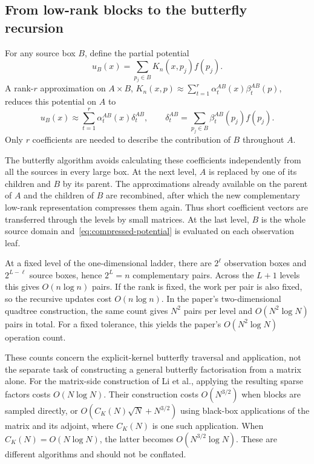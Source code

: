 \subsection{From low-rank blocks to the butterfly recursion}
\label{subsec:butterfly-recursion}

For any source box $B$, define the partial potential
\begin{equation}
    u_B(x)=\sum_{p_j\in B}K_n(x,p_j)f(p_j).
\end{equation}
A rank-$r$ approximation on $A\times B$,
$K_n(x,p)\approx\sum_{t=1}^{r}\alpha_t^{AB}(x)\beta_t^{AB}(p)$, reduces this potential on $A$ to
\begin{equation}
    u_B(x)\approx\sum_{t=1}^{r}\alpha_t^{AB}(x)\delta_t^{AB},
    \qquad
    \delta_t^{AB}=\sum_{p_j\in B}\beta_t^{AB}(p_j)f(p_j).
    \label{eq:compressed-potential}
\end{equation}
Only $r$ coefficients are needed to describe the contribution of $B$ throughout $A$.

The butterfly algorithm avoids calculating these coefficients independently from all the sources in every large box. At the next level, $A$ is replaced by one of its children and $B$ by its parent. The approximations already available on the parent of $A$ and the children of $B$ are recombined, after which the new complementary low-rank representation compresses them again. Thus short coefficient vectors are transferred through the levels by small matrices. At the last level, $B$ is the whole source domain and~\eqref{eq:compressed-potential} is evaluated on each observation leaf.

At a fixed level of the one-dimensional ladder, there are $2^\ell$ observation boxes and $2^{L-\ell}$ source boxes, hence $2^L=n$ complementary pairs. Across the $L+1$ levels this gives $O(n\log n)$ pairs. If the rank is fixed, the work per pair is also fixed, so the recursive updates cost $O(n\log n)$. In the paper's two-dimensional quadtree construction, the same count gives $N^2$ pairs per level and $O(N^2\log N)$ pairs in total. For a fixed tolerance, this yields the paper's $O(N^2\log N)$ operation count.

These counts concern the explicit-kernel butterfly traversal and application, not the separate task of constructing a general butterfly factorisation from a matrix alone. For the matrix-side construction of Li et al., applying the resulting sparse factors costs $O(N\log N)$. Their construction costs $O(N^{3/2})$ when blocks are sampled directly, or $O(C_K(N)\sqrt N+N^{3/2})$ using black-box applications of the matrix and its adjoint, where $C_K(N)$ is one such application. When $C_K(N)=O(N\log N)$, the latter becomes $O(N^{3/2}\log N)$. These are different algorithms and should not be conflated.

